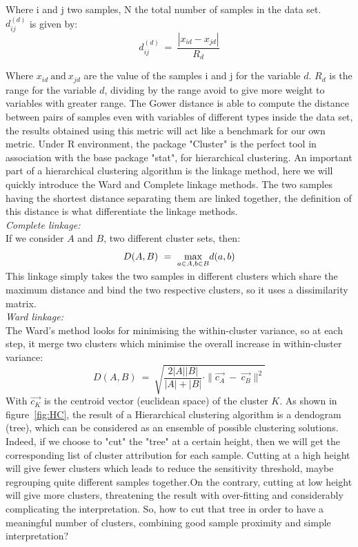 \documentclass[twocolumn,12pt]{article}
\begin{document}
Where i and j two samples, N the total number of samples in the data set.\\
$d_{ij}^{(d)}$ is given by:\\
$$d_{ij}^{(d)}\ =\ \frac{|x_{id}-x_{jd}|}{R_d}$$


Where $x_{id}\ \text{and}\ x_{jd}$ are the value of the samples i and j for the variable $d$.
$R_d$ is the range for the variable $d$, dividing by the range avoid to give more weight to variables with greater range.
The Gower distance is able to compute the distance between pairs of samples even with variables of different types inside the data set, the results obtained using this metric will act like a benchmark for our own metric.
Under R environment, the package "Cluster"\cite{maechler} is the perfect tool in association with the base package "stat", for hierarchical clustering.
An important part of a hierarchical clustering algorithm is the linkage method, here we will quickly introduce the Ward and Complete linkage methods.
The two samples having the shortest distance separating them are linked together, the definition of this distance is what differentiate the linkage methods.\\
\emph{Complete linkage:}\\
If we consider $A$ and $B$, two different cluster sets, then:
\begin{equation}\label{equ:comp}
    D(A,B)\ =\ \smash{\displaystyle\max_{a\in A,b\in B}}d(a,b)
\end{equation}
This linkage simply takes the two samples in different clusters which share the maximum distance and bind the two respective clusters, so it uses a dissimilarity matrix.\\
\emph{Ward linkage:}\\
The Ward's method looks for minimising the within-cluster variance, so at each step, it merge two clusters which minimise the overall increase in within-cluster variance:
\begin{equation}\label{equ:ward}
    D(A,B)\ =\ \sqrt{\frac{2|A||B|}{|A|+|B|}\cdot \|\overrightarrow{c_A}\ -\ \overrightarrow{c_B}\|^2}
\end{equation}
With $\overrightarrow{c_K}$ is the centroid vector (euclidean space) of the cluster $K$.
As shown in figure~\ref{fig:HC}, the result of a Hierarchical clustering algorithm is a dendogram (tree), which can be considered as an ensemble of possible clustering solutions.
Indeed, if we choose to "cut" the "tree" at a certain height, then we will get the corresponding list of cluster attribution for each sample. Cutting at a high height will give fewer clusters which leads to reduce the sensitivity threshold, maybe regrouping quite different samples together.On the contrary, cutting at low height will give more clusters, threatening the result with over-fitting and considerably complicating the interpretation. So, how to cut that tree in order to have a meaningful number of clusters, combining good sample proximity and simple interpretation?
\end{document}

